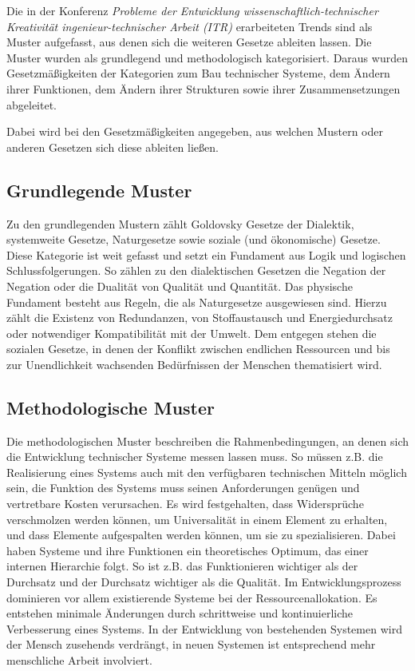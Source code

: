 \documentclass[a4paper,11pt]{article}
\begin{document}
Die in der Konferenz \emph{Probleme der Entwicklung
  wissenschaftlich-technischer Kreativität inge\-nieur-technischer Arbeit
  (ITR)} erarbeiteten Trends sind als Muster aufgefasst, aus denen sich die
weiteren Gesetze ableiten lassen. Die Muster wurden als grundlegend und
methodologisch kategorisiert. Daraus wurden Gesetzmäßigkeiten der Kategorien
zum Bau technischer Systeme, dem Ändern ihrer Funktionen, dem Ändern ihrer
Strukturen sowie ihrer Zusammensetzungen abgeleitet.

Dabei wird bei den Gesetzmäßigkeiten angegeben, aus welchen Mustern oder
anderen Gesetzen sich diese ableiten ließen.

\subsection{Grundlegende Muster}

Zu den grundlegenden Mustern zählt Goldovsky Gesetze der Dialektik,
systemweite Gesetze, Naturgesetze sowie soziale (und ökonomische) Gesetze.
Diese Kategorie ist weit gefasst und setzt ein Fundament aus Logik und
logischen Schlussfolgerungen.  So zählen zu den dialektischen Gesetzen die
Negation der Negation oder die Dualität von Qualität und Quantität. Das
physische Fundament besteht aus Regeln, die als Naturgesetze ausgewiesen sind.
Hierzu zählt die Existenz von Redundanzen, von Stoffaustausch und
Energiedurchsatz oder notwendiger Kompatibilität mit der Umwelt. Dem entgegen
stehen die sozialen Gesetze, in denen der Konflikt zwischen endlichen
Ressourcen und bis zur Unendlichkeit wachsenden Bedürfnissen der Menschen
thematisiert wird.

\subsection{Methodologische Muster}

Die methodologischen Muster beschreiben die Rahmenbedingungen, an denen sich
die Entwicklung technischer Systeme messen lassen muss. So müssen z.B. die
Realisierung eines Systems auch mit den verfügbaren technischen Mitteln
möglich sein, die Funktion des Systems muss seinen Anforderungen genügen und
vertretbare Kosten verursachen. Es wird festgehalten, dass Widersprüche
verschmolzen werden können, um Universalität in einem Element zu erhalten, und
dass Elemente aufgespalten werden können, um sie zu spezialisieren. Dabei
haben Systeme und ihre Funktionen ein theoretisches Optimum, das einer
internen Hierarchie folgt. So ist z.B. das Funktionieren wichtiger als der
Durchsatz und der Durchsatz wichtiger als die Qualität. Im Entwicklungsprozess
dominieren vor allem existierende Systeme bei der Ressourcenallokation. Es
entstehen minimale Änderungen durch schrittweise und kontinuierliche
Verbesserung eines Systems. In der Entwicklung von bestehenden Systemen wird
der Mensch zusehends verdrängt, in neuen Systemen ist entsprechend mehr
menschliche Arbeit involviert.
\end{document}
